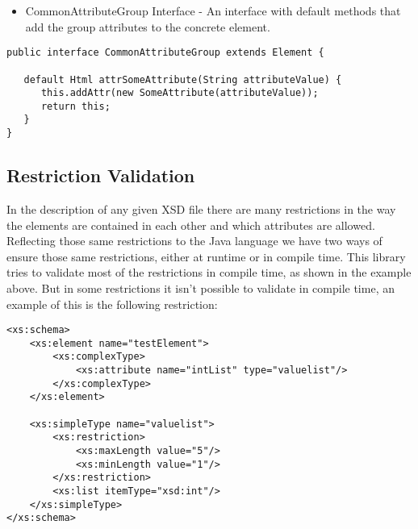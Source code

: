 \begin{itemize}
	\item CommonAttributeGroup Interface - An interface with default methods that add the group attributes to the concrete element.
\end{itemize}

\bigskip

\begin{minipage}{\linewidth}
\begin{lstlisting}[caption={CommonAttributeGroup Interface},captionpos=b]
public interface CommonAttributeGroup extends Element {

   default Html attrSomeAttribute(String attributeValue) {
      this.addAttr(new SomeAttribute(attributeValue));
      return this;
   }
}
\end{lstlisting}
\end{minipage}


\subsection{Restriction Validation}
\label{sec:restrictionvalidation}

In the description of any given \ac{XSD} file there are many restrictions in the way the elements are contained in each other and which attributes are allowed. Reflecting those same restrictions to the Java language we have two ways of ensure those same restrictions, either at runtime or in compile time. This library tries to validate most of the restrictions in compile time, as shown in the example above. But in some restrictions it isn't possible to validate in compile time, an example of this is the following restriction:

\bigskip


\begin{minipage}{\linewidth}
\begin{lstlisting}[caption={Restrictions Example},captionpos=b]
<xs:schema>
    <xs:element name="testElement">
        <xs:complexType>
            <xs:attribute name="intList" type="valuelist"/>
        </xs:complexType>
    </xs:element>
    
    <xs:simpleType name="valuelist">
        <xs:restriction>
            <xs:maxLength value="5"/>
            <xs:minLength value="1"/>
        </xs:restriction>
        <xs:list itemType="xsd:int"/>
    </xs:simpleType>
</xs:schema>
\end{lstlisting}
\end{minipage}


